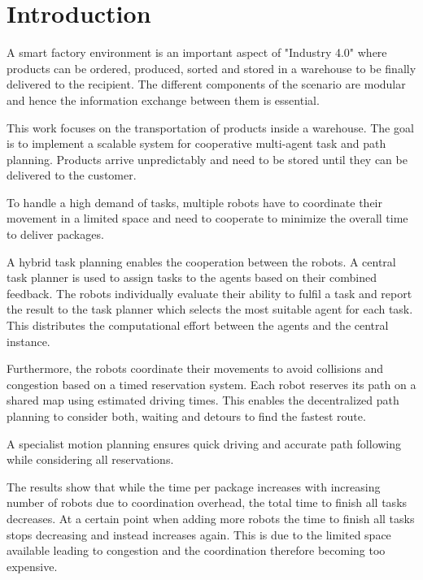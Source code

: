 \documentclass[journal]{IEEEtran}
\begin{document}
%
\IEEEpeerreviewmaketitle

\section{Introduction}
\label{sec:introduction}
A smart factory environment is an important aspect of "Industry 4.0" where products can be ordered, produced, sorted and stored in a warehouse to be finally delivered to the recipient. The different components of the scenario are modular and hence the information exchange between them is essential.

This work focuses on the transportation of products inside a warehouse. The goal is to implement a scalable system for cooperative multi-agent task and path planning. Products arrive unpredictably and need to be stored until they can be delivered to the customer.

To handle a high demand of tasks, multiple robots have to coordinate their movement in a limited space and need to cooperate to minimize the overall time to deliver packages.

A hybrid task planning enables the cooperation between the robots. A central task planner is used to assign tasks to the agents based on their combined feedback. The robots individually evaluate their ability to fulfil a task and report the result to the task planner which selects the most suitable agent for each task. This distributes the computational effort between the agents and the central instance.

Furthermore, the robots coordinate their movements to avoid collisions and congestion based on a timed reservation system. Each robot reserves its path on a shared map using estimated driving times. This enables the decentralized path planning to consider both, waiting and detours to find the fastest route.

A specialist motion planning ensures quick driving and accurate path following while considering all reservations.

The results show that while the time per package increases with increasing number of robots due to coordination overhead, the total time to finish all tasks decreases. 
At a certain point when adding more robots the time to finish all tasks stops decreasing and instead increases again.
This is due to the limited space available leading to congestion and the coordination therefore becoming too expensive.
\end{document}
